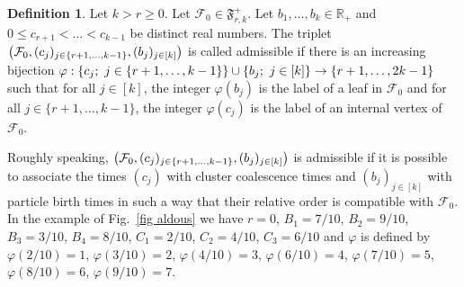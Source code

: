\documentclass[11pt]{article}
\theoremstyle{plain}
\theoremstyle{definition}
\newtheorem{definition}[theorem]{Definition}
\theoremstyle{remark}
\newcommand{\R}{\mathbb{R}} %
\newcommand{\1}{\mathbbm{1}} %
\let\originalleft\left
\let\originalright\right
\renewcommand{\left}{\mathopen{}\mathclose\bgroup\originalleft}
\renewcommand{\right}{\aftergroup\egroup\originalright}
\begin{document}
\begin{definition}
Let $k>r\ge 0$. Let $\mathcal{F}_0 \in \mathfrak{F}^+_{r,k}$. Let $b_1,\ldots,b_k \in \R_+$ and $0\le c_{r+1}<\ldots < c_{k-1}$ be distinct real numbers. The triplet $\left(\mathcal{F}_0, (c_j)_{j \in \{r+1,\ldots,k-1\}}, (b_j)_{j \in [k]}\right)$ is called admissible if there is an increasing bijection $\varphi: \left\{c_j ; \ j\in \{ r+1,\ldots, k-1 \} \right\} \cup \left\{b_j ; \ j \in [k]\right\} \to \{r+1,\ldots,2k-1\}$ such that for all $j \in [k]$, the integer $\varphi(b_j)$ is the label of a leaf in $\mathcal{F}_0$ and for all $j \in  \{r+1,\ldots,k-1\}$, the integer $\varphi(c_j)$ is the label of an internal vertex of $\mathcal{F}_0$.
\end{definition}

Roughly speaking, $\left(\mathcal{F}_0, (c_j)_{j \in \{r+1,\ldots,k-1\}}, (b_j)_{j \in [k]}\right)$  is admissible if it is possible to associate the times $(c_{j})$ with cluster coalescence times and $(b_{j})_{j \in [k]}$ with particle birth times  in such a way that their relative order is compatible with $\mathcal{F}_0$. In the example of Fig.~\ref{fig aldous} we have $r=0$, $B_{1}=7/10$, $B_{2}=9/10$, $B_{3}=3/10$, $B_{4}=8/10$, $C_{1}=2/10$, $C_{2}=4/10$, $C_{3}=6/10$ and $\varphi$ is defined by $\varphi(2/10)=1$, $\varphi(3/10)=2$, $\varphi(4/10)=3$, $\varphi(6/10)=4$, $\varphi(7/10)=5$, $\varphi(8/10)=6$, $\varphi(9/10)=7$.
\end{document}
